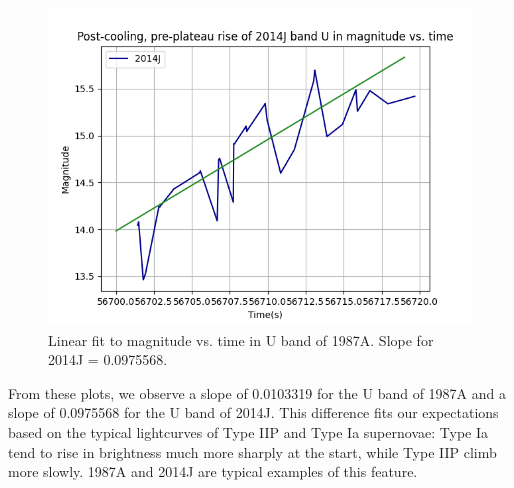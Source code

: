\begin{figure}[h]
	\includegraphics[width=1.0\textwidth]{2014J_U_linear.png}
	\caption{Linear fit to magnitude vs. time in U band of 1987A. Slope for 2014J = 0.0975568.}
\end{figure}

From these plots, we observe a slope of 0.0103319 for the U band of 1987A and a slope of 0.0975568 for the U band of 2014J. This difference fits our expectations based on the typical lightcurves of Type IIP and Type Ia supernovae: Type Ia tend to rise in brightness much more sharply at the start, while Type IIP climb more slowly. 1987A and 2014J are typical examples of this feature.

